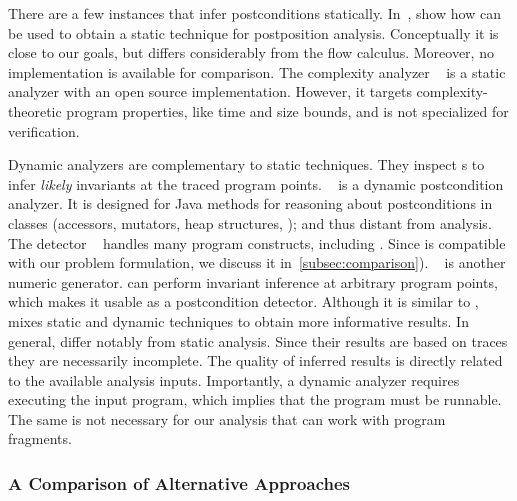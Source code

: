 There are a few instances that infer postconditions statically.
In~\cite{popeea2006}, show how  can be used to obtain a static technique for postposition analysis.
Conceptually it is close to our goals, but  differs considerably from the flow calculus.
Moreover, no implementation is available for comparison.
The complexity analyzer ~\cite{giesl2022} is a static analyzer with an open source implementation.
However, it targets complexity-theoretic program properties, like time and size bounds, and is not specialized for verification.

Dynamic analyzers are complementary to static techniques.
They inspect s to infer \emph{likely} invariants at the traced program points.
~\cite{molina2021} is a dynamic postcondition analyzer.
It is designed for Java methods for reasoning about postconditions in classes (accessors, mutators, heap structures, \etc);
and thus distant from  analysis.
The  detector ~\cite{ernst2007} handles many program constructs, including .
Since  is compatible with our problem formulation, we discuss it in~\autoref{subsec:comparison}).
~\cite{nguyen2014} is another numeric  generator.
 can perform invariant inference at arbitrary program points, which makes it usable as a postcondition detector.
Although it is similar to ,  mixes static and dynamic techniques to obtain more informative results.
In general,  differ notably from static analysis.
Since their results are based on traces they are necessarily incomplete.
The quality of inferred results is directly related to the available analysis inputs.
Importantly, a dynamic analyzer requires executing the input program, which implies that the program must be runnable.
The same is not necessary for our analysis that can work with program fragments.

\subsubsection{A Comparison of Alternative Approaches}
\label{subsec:comparison}

